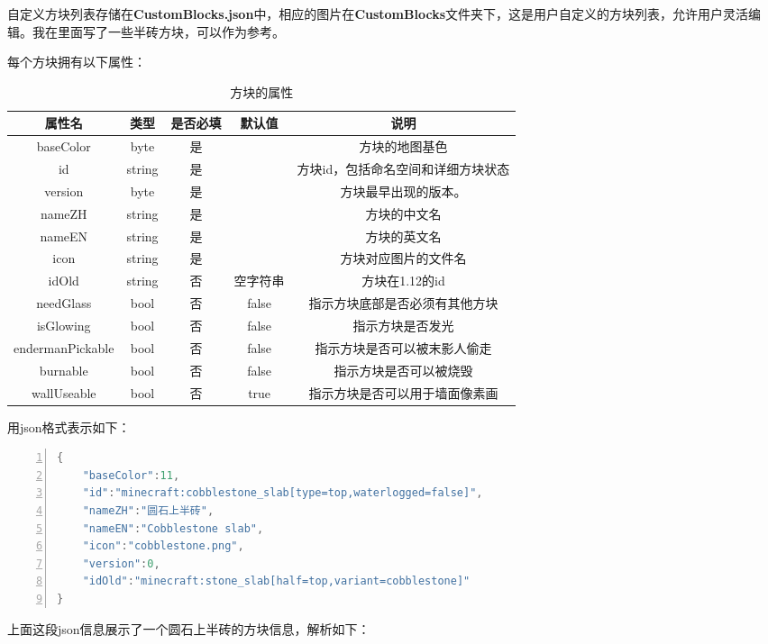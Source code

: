 \documentclass{article}
\begin{document}
   自定义方块列表存储在\textbf{CustomBlocks.json}中，相应的图片在\textbf{CustomBlocks}文件夹下，这是用户自定义的方块列表，允许用户灵活编辑。我在里面写了一些半砖方块，可以作为参考。
   
   每个方块拥有以下属性：
   \begin{table}[h]
    \centering
    \caption{方块的属性}
    \begin{tabular}{ccccc}
        \hline
        属性名 & 类型 & 是否必填 & 默认值 & 说明  \\ \hline
        baseColor & byte & 是 & & 方块的地图基色 \\
        id & string & 是 & & 方块id，包括命名空间和详细方块状态\\
        version & byte & 是 & & 方块最早出现的版本。 \\
        nameZH & string & 是 & & 方块的中文名 \\
        nameEN & string & 是 & & 方块的英文名 \\
        icon & string & 是 & & 方块对应图片的文件名 \\
        idOld & string & 否 & 空字符串 & 方块在1.12的id \\
        needGlass & bool & 否 & false & 指示方块底部是否必须有其他方块 \\
        isGlowing & bool & 否 & false & 指示方块是否发光 \\
        endermanPickable & bool & 否 & false & 指示方块是否可以被末影人偷走 \\
        burnable & bool & 否 & false & 指示方块是否可以被烧毁 \\
        wallUseable & bool & 否 & true & 指示方块是否可以用于墙面像素画 \\
        \hline 
    \end{tabular}       
   \end{table}
   
   \clearpage
   用json格式表示如下：
\begin{lstlisting}[language = C++, numbers=left, 
    numberstyle=\tiny,keywordstyle=\color{blue!70},
    commentstyle=\color{red!50!green!50!blue!50},frame=shadowbox,
    rulesepcolor=\color{red!20!green!20!blue!20},basicstyle=\ttfamily]
{
    "baseColor":11,
    "id":"minecraft:cobblestone_slab[type=top,waterlogged=false]",
    "nameZH":"圆石上半砖",
    "nameEN":"Cobblestone slab",
    "icon":"cobblestone.png",
    "version":0,
    "idOld":"minecraft:stone_slab[half=top,variant=cobblestone]"
}
    \end{lstlisting}
    上面这段json信息展示了一个圆石上半砖的方块信息，解析如下：
\end{document}
